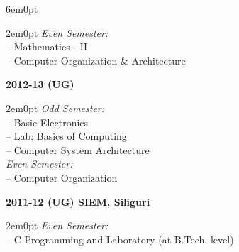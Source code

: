 \documentclass[11pt,a4paper]{moderncv}
\begin{document}
\begin{adjustwidth}{6em}{0pt}
\begin{adjustwidth}{2em}{0pt}
		\textit{Even Semester:} \\
		\hspace*{1.5em}-- Mathematics - II \\
		\hspace*{1.5em}-- Computer Organization \& Architecture \\
	\end{adjustwidth}
	
	
	\textbf{2012-13 (UG)}
	
	\begin{adjustwidth}{2em}{0pt}
		\textit{Odd Semester:} \\
		\hspace*{1.5em}-- Basic Electronics \\
		\hspace*{1.5em}-- Lab: Basics of Computing \\
		\hspace*{1.5em}-- Computer System Architecture \\
		
		\textit{Even Semester:} \\
		\hspace*{1.5em}-- Computer Organization \\
	\end{adjustwidth}
	
	
	\textbf{2011-12 (UG) SIEM, Siliguri}
	
	\begin{adjustwidth}{2em}{0pt}
		\textit{Even Semester:} \\
		\hspace*{1.5em}-- C Programming and Laboratory (at B.Tech. level) \\
	\end{adjustwidth}
	
\end{adjustwidth}
\end{document}
